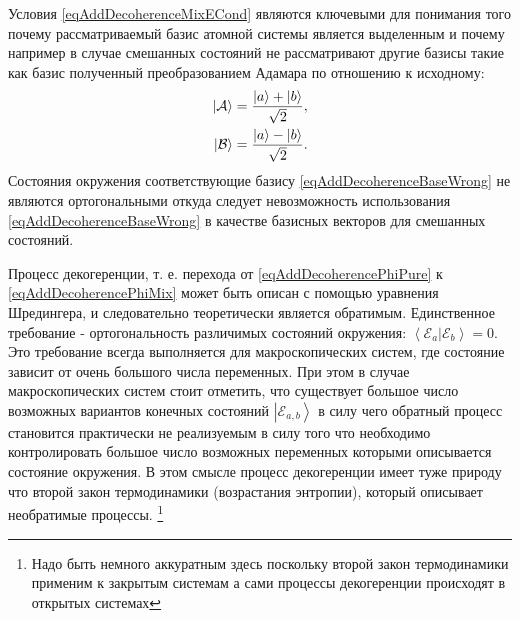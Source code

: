 Условия \eqref{eqAddDecoherenceMixECond} являются ключевыми для
понимания того почему рассматриваемый базис атомной системы является
выделенным и почему например в случае смешанных состояний не
рассматривают другие базисы такие как базис полученный преобразованием
Адамара по отношению к исходному:
\begin{eqnarray}
\left|\mathcal{A}\right> = \frac{\ket{a} + \ket{b}}
              {\sqrt{2}},
\nonumber \\
\left|\mathcal{B}\right> = \frac{\ket{a} - \ket{b}}
              {\sqrt{2}}.
\label{eqAddDecoherenceBaseWrong}
\end{eqnarray}
Состояния окружения соответствующие базису
\eqref{eqAddDecoherenceBaseWrong} не являются ортогональными откуда
следует невозможность использования \eqref{eqAddDecoherenceBaseWrong}
в качестве базисных векторов для смешанных состояний. 

Процесс декогеренции, т. е. перехода от
\eqref{eqAddDecoherencePhiPure} к \eqref{eqAddDecoherencePhiMix} может
быть описан с помощью уравнения Шредингера, и следовательно
теоретически является обратимым. Единственное требование -
ортогональность различимых состояний окружения: 
$\left<\mathcal{E}_a\right.\left|\mathcal{E}_b\right> = 0$. Это
требование всегда выполняется для макроскопических систем, где
состояние зависит от очень большого числа переменных. При этом в
случае макроскопических систем стоит отметить, что существует большое
число возможных вариантов конечных состояний
$\left|\mathcal{E}_{a,b}\right>$ 
в силу чего обратный процесс становится практически не реализуемым в
силу того что необходимо контролировать большое число возможных
переменных которыми описывается состояние окружения. В этом смысле
процесс декогеренции имеет туже природу что второй закон термодинамики 
(возрастания энтропии), который описывает
необратимые процессы.
\footnote{Надо быть немного аккуратным здесь
  поскольку второй закон термодинамики применим к закрытым системам а
  сами процессы декогеренции происходят в открытых системах}


